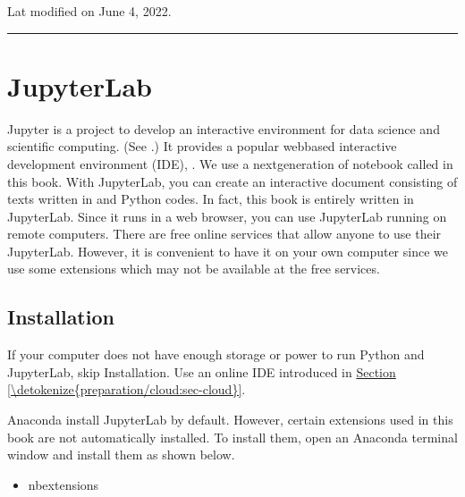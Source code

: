 \documentclass[letterpaper,10pt,english]{jupyterBook}
\begin{document}
\sphinxAtStartPar
Lat modified on June 4, 2022.


\bigskip\hrule\bigskip


\sphinxstepscope


\section{JupyterLab}
\label{\detokenize{preparation/jupyter:jupyterlab}}\label{\detokenize{preparation/jupyter:sec-jupyter}}\label{\detokenize{preparation/jupyter::doc}}
\sphinxAtStartPar
Jupyter is a project to develop an interactive environment for data science and scientific computing. (See .)  It provides a popular web\sphinxhyphen{}based interactive development environment (IDE), .  We use a next\sphinxhyphen{}generation of notebook called  in this book.  With JupyterLab, you can create an interactive document consisting of texts written in  and Python codes.  In fact, this book is entirely written in JupyterLab. Since it runs in a web browser, you can use JupyterLab running on remote computers.  There are free online services that allow anyone to use their JupyterLab.  However, it is convenient to have it on your own computer since we use some extensions which may not be available at the free services.


\subsection{Installation  \sphinxfootnotemark[1]}
\label{\detokenize{preparation/jupyter:installation}}%
\begin{footnotetext}[1]\label{\thesphinxscope.1}%
\sphinxAtStartFootnote
If your computer does not have enough storage or power to run Python and JupyterLab, skip Installation.  Use an online IDE introduced in \hyperref[\detokenize{preparation/cloud:sec-cloud}]{Section \ref{\detokenize{preparation/cloud:sec-cloud}}}.
%
\end{footnotetext}\ignorespaces
\sphinxAtStartPar
Anaconda install JupyterLab by default.  However, certain extensions used in this book are not automatically installed.  To install them, open an Anaconda terminal window and install them as shown below.
\begin{itemize}
\item {}
\sphinxAtStartPar
nbextensions

\end{itemize}
\end{document}
